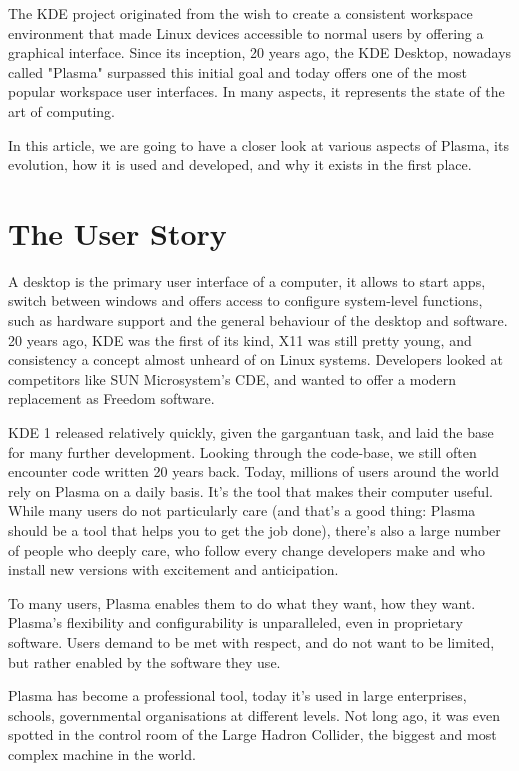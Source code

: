 

\noindent{}The KDE project originated from the wish to create a consistent workspace environment that made Linux devices accessible to normal users by offering a graphical interface.
Since its inception, 20 years ago, the KDE Desktop, nowadays called "Plasma" surpassed this initial goal and today offers one of the most popular workspace user interfaces. In many aspects, it represents the state of the art of computing.

In this article, we are going to have a closer look at various aspects of Plasma, its evolution, how it is used and developed, and why it exists in the first place.

\section*{The User Story}

A desktop is the primary user interface of a computer, it allows to start apps, switch between windows and offers access to configure system-level functions, such as hardware support and the general behaviour of the desktop and software. 20 years ago, KDE was the first of its kind, X11 was still pretty young, and consistency a concept almost unheard of on Linux systems. Developers looked at competitors like SUN Microsystem's CDE, and wanted to offer a modern replacement as Freedom software.

KDE 1 released relatively quickly, given the gargantuan task, and laid the base for many further development. Looking through the code-base, we still often encounter code written 20 years back.
Today, millions of users around the world rely on Plasma on a daily basis. It's the tool that makes their computer useful. While many users do not particularly care (and that's a good thing: Plasma should be a tool that helps you to get the job done), there's also a large number of people who deeply care, who follow every change developers make and who install new versions with excitement and anticipation.

To many users, Plasma enables them to do what they want, how they want. Plasma's flexibility and configurability is unparalleled, even in proprietary software. Users demand to be met with respect, and do not want to be limited, but rather enabled by the software they use.

Plasma has become a professional tool, today it's used in large enterprises, schools, governmental organisations at different levels. Not long ago, it was even spotted in the control room of the Large Hadron Collider, the biggest and most complex machine in the world.

